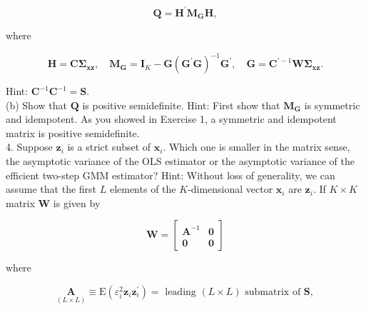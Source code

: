 \documentclass[10pt]{article}
\begin{document}
$$
\mathbf{Q}=\mathbf{H}^{\prime} \mathbf{M}_{\mathbf{G}} \mathbf{H},
$$

where

$$
\mathbf{H}=\mathbf{C} \boldsymbol{\Sigma}_{\mathbf{x z}}, \quad \mathbf{M}_{\mathbf{G}}=\mathbf{I}_{K}-\mathbf{G}\left(\mathbf{G}^{\prime} \mathbf{G}\right)^{-1} \mathbf{G}^{\prime}, \quad \mathbf{G}=\mathbf{C}^{\prime-1} \mathbf{W} \boldsymbol{\Sigma}_{\mathbf{x z}} .
$$

Hint: $\mathbf{C}^{-1} \mathbf{C}^{-1}=\mathbf{S}$.\\
(b) Show that $\mathbf{Q}$ is positive semidefinite. Hint: First show that $\mathbf{M}_{\mathbf{G}}$ is symmetric and idempotent. As you showed in Exercise 1, a symmetric and idempotent matrix is positive semidefinite.\\
4. Suppose $\mathbf{z}_{i}$ is a strict subset of $\mathbf{x}_{i}$. Which one is smaller in the matrix sense, the asymptotic variance of the OLS estimator or the asymptotic variance of the efficient two-step GMM estimator? Hint: Without loss of generality, we can assume that the first $L$ elements of the $K$-dimensional vector $\mathbf{x}_{i}$ are $\mathbf{z}_{i}$. If $K \times K$ matrix $\mathbf{W}$ is given by

$$
\mathbf{W}=\left[\begin{array}{cc}
\mathbf{A}^{-1} & \mathbf{0} \\
\mathbf{0} & \mathbf{0}
\end{array}\right]
$$

where

$$
\underset{(L \times L)}{\mathbf{A}} \equiv \mathrm{E}\left(\varepsilon_{i}^{2} \mathbf{z}_{i} \mathbf{z}_{i}^{\prime}\right)=\text { leading }(L \times L) \text { submatrix of } \mathbf{S},
$$
\end{document}
